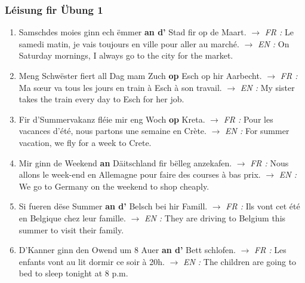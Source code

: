 \subsubsection*{Léisung fir Übung 1}
\begin{enumerate}
    \item Samschdes moies ginn ech ëmmer \textbf{an d'} Stad fir op de Maart.
    $\rightarrow$ \textit{FR :} Le samedi matin, je vais toujours en ville pour aller au marché.
    $\rightarrow$ \textit{EN :} On Saturday mornings, I always go to the city for the market.

    \item Meng Schwëster fiert all Dag mam Zuch \textbf{op} Esch op hir Aarbecht.
    $\rightarrow$ \textit{FR :} Ma sœur va tous les jours en train à Esch à son travail.
    $\rightarrow$ \textit{EN :} My sister takes the train every day to Esch for her job.

    \item Fir d'Summervakanz fléie mir eng Woch \textbf{op} Kreta.
    $\rightarrow$ \textit{FR :} Pour les vacances d'été, nous partons une semaine en Crète.
    $\rightarrow$ \textit{EN :} For summer vacation, we fly for a week to Crete.

    \item Mir ginn de Weekend \textbf{an} Däitschland fir bëlleg anzekafen.
    $\rightarrow$ \textit{FR :} Nous allons le week-end en Allemagne pour faire des courses à bas prix.
    $\rightarrow$ \textit{EN :} We go to Germany on the weekend to shop cheaply.

    \item Si fueren dëse Summer \textbf{an d'} Belsch bei hir Famill.
    $\rightarrow$ \textit{FR :} Ils vont cet été en Belgique chez leur famille.
    $\rightarrow$ \textit{EN :} They are driving to Belgium this summer to visit their family.

    \item D'Kanner ginn den Owend um 8 Auer \textbf{an d'} Bett schlofen.
    $\rightarrow$ \textit{FR :} Les enfants vont au lit dormir ce soir à 20h.
    $\rightarrow$ \textit{EN :} The children are going to bed to sleep tonight at 8 p.m.
\end{enumerate}

